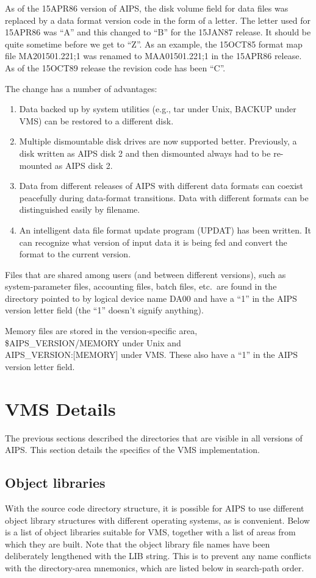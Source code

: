 As of the 15APR86 version of AIPS, the disk volume field for data
files was replaced by a data format version code in the form of a
letter.  The letter used for 15APR86 was ``A'' and this changed to ``B''
for the 15JAN87 release.  It should be quite sometime before we get to
``Z''.  As an example, the 15OCT85 format map file MA201501.221;1 was
renamed to MAA01501.221;1 in the 15APR86 release.  As of the 15OCT89
release the revision code has been ``C''.

The change has a number of advantages:

\begin{enumerate} %
\item Data backed up by system utilities (e.g., tar under Unix, BACKUP under
VMS) can be restored to a different disk.
\item Multiple dismountable disk drives are now supported better.
Previously, a disk written as AIPS disk 2 and then dismounted always
had to be re-mounted as AIPS disk 2.
\item Data from different releases of AIPS with different data formats can
coexist peacefully during data-format transitions.  Data with
different formats can be distinguished easily by filename.
\item An intelligent data file format update program
(UPDAT) has been written. It can recognize what version
of input data it is being fed and convert the format to the current
version.

\end{enumerate} %
Files that are shared among users (and between different versions),
such as system-parameter files, accounting files, batch files, etc.~are
found in the directory pointed to by logical device name DA00 and
have a ``1'' in the AIPS version letter field (the ``1'' doesn't signify
anything).

Memory files are stored in the version-specific area,
\$AIPS\_VERSION/MEMORY under Unix and \\
AIPS\_VERSION:[MEMORY] under VMS.  These also have a ``1'' in the AIPS
version letter field.


\section{VMS Details}
The previous sections described the directories that are visible in
all versions of AIPS. This section details the specifics of the VMS
implementation.


\subsection{Object libraries}
With the source code directory structure, it is possible for AIPS to
use different object library structures with different operating
systems, as is convenient. Below is a list of object libraries
suitable for VMS, together with a list of areas from which they are
built. Note that the object library file names have been deliberately
lengthened with the LIB string. This is to prevent any name conflicts
with the directory-area mnemonics, which are listed below in
search-path order.

